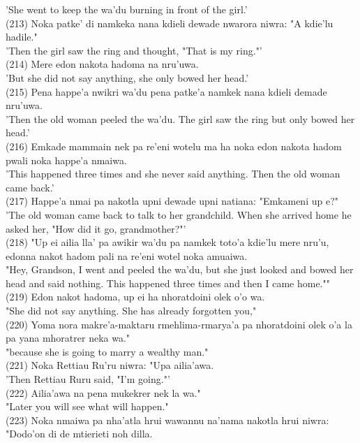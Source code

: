 \documentclass[10pt]{article}
\begin{document}
'She went to keep the wa'du burning in front of the girl.'\\
(213) Noka patke' di namkeka nana kdieli dewade nwarora niwra: "A kdie'lu hadile."\\
'Then the girl saw the ring and thought, "That is my ring."'\\
(214) Mere edon nakota hadoma na nru'uwa.\\
'But she did not say anything, she only bowed her head.'\\
(215) Pena happe'a nwikri wa'du pena patke'a namkek nana kdieli demade nru'uwa.\\
'Then the old woman peeled the wa'du. The girl saw the ring but only bowed her head.'\\
(216) Emkade mammain nek pa re'eni wotelu ma ha noka edon nakota hadom pwali noka happe'a nmaiwa.\\
'This happened three times and she never said anything. Then the old woman came back.'\\
(217) Happe'a nmai pa nakotla upni dewade upni natiana: "Emkameni up e?"\\
'The old woman came back to talk to her grandchild. When she arrived home he asked her, "How did it go, grandmother?"'\\
(218) "Up ei ailia lla' pa awikir wa'du pa namkek toto'a kdie'lu mere nru'u, edonna nakot hadom pali na re'eni wotel noka amuaiwa.\\
"Hey, Grandson, I went and peeled the wa'du, but she just looked and bowed her head and said nothing. This happened three times and then I came home.""\\
(219) Edon nakot hadoma, up ei ha nhoratdoini olek o'o wa.\\
"She did not say anything. She has already forgotten you,"\\
(220) Yoma nora makre'a-maktaru rmehlima-rmarya'a pa nhoratdoini olek o'a la pa yana mhoratrer neka wa."\\
"because she is going to marry a wealthy man."\\
(221) Noka Rettiau Ru'ru niwra: "Upa ailia'awa.\\
'Then Rettiau Ruru said, "I'm going."'\\
(222) Ailia'awa na pena mukekrer nek la wa."\\
"Later you will see what will happen."\\
(223) Noka nmaiwa pa nha'atla hrui wawannu na'nama nakotla hrui niwra: "Dodo'on di de mtierieti noh dilla.\\
\end{document}
